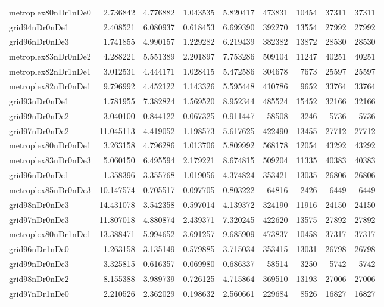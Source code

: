 \begin{longtable}{|l|r|r|r|r|r|r|r|r|}
metroplex80nDr1nDe0 & 2.736842 & 4.776882 & 1.043535 & 5.820417 & 473831 & 10454 & 37311 & 37311 \\
grid94nDr0nDe1 & 2.408521 & 6.080937 & 0.618453 & 6.699390 & 392270 & 13554 & 27992 & 27992 \\
grid96nDr0nDe3 & 1.741855 & 4.990157 & 1.229282 & 6.219439 & 382382 & 13872 & 28530 & 28530 \\
metroplex83nDr0nDe2 & 4.288221 & 5.551389 & 2.201897 & 7.753286 & 509104 & 11247 & 40251 & 40251 \\
metroplex82nDr1nDe1 & 3.012531 & 4.444171 & 1.028415 & 5.472586 & 304678 & 7673 & 25597 & 25597 \\
metroplex82nDr0nDe1 & 9.796992 & 4.452122 & 1.143326 & 5.595448 & 410786 & 9652 & 33764 & 33764 \\
grid93nDr0nDe1 & 1.781955 & 7.382824 & 1.569520 & 8.952344 & 485524 & 15452 & 32166 & 32166 \\
grid99nDr0nDe2 & 3.040100 & 0.844122 & 0.067325 & 0.911447 & 58508 & 3246 & 5736 & 5736 \\
grid97nDr0nDe2 & 11.045113 & 4.419052 & 1.198573 & 5.617625 & 422490 & 13455 & 27712 & 27712 \\
metroplex80nDr0nDe1 & 3.263158 & 4.796286 & 1.013706 & 5.809992 & 568178 & 12054 & 43292 & 43292 \\
metroplex83nDr0nDe3 & 5.060150 & 6.495594 & 2.179221 & 8.674815 & 509204 & 11335 & 40383 & 40383 \\
grid96nDr0nDe1 & 1.358396 & 3.355768 & 1.019056 & 4.374824 & 353421 & 13035 & 26806 & 26806 \\
metroplex85nDr0nDe3 & 10.147574 & 0.705517 & 0.097705 & 0.803222 & 64816 & 2426 & 6449 & 6449 \\
grid98nDr0nDe3 & 14.431078 & 3.542358 & 0.597014 & 4.139372 & 324190 & 11916 & 24150 & 24150 \\
grid97nDr0nDe3 & 11.807018 & 4.880874 & 2.439371 & 7.320245 & 422620 & 13575 & 27892 & 27892 \\
metroplex80nDr1nDe1 & 13.388471 & 5.994652 & 3.691257 & 9.685909 & 473837 & 10458 & 37317 & 37317 \\
grid96nDr1nDe0 & 1.263158 & 3.135149 & 0.579885 & 3.715034 & 353415 & 13031 & 26798 & 26798 \\
grid99nDr0nDe3 & 3.325815 & 0.616357 & 0.069980 & 0.686337 & 58514 & 3250 & 5742 & 5742 \\
grid98nDr0nDe2 & 8.155388 & 3.989739 & 0.726125 & 4.715864 & 369510 & 13193 & 27006 & 27006 \\
grid97nDr1nDe0 & 2.210526 & 2.362029 & 0.198632 & 2.560661 & 229684 & 8526 & 16827 & 16827 \\

\end{longtable}
